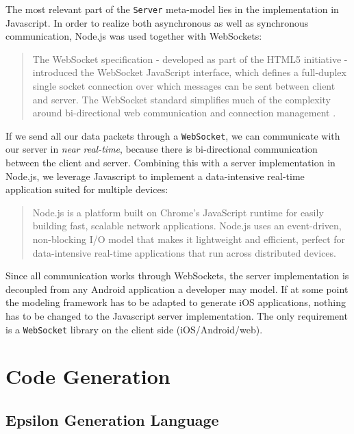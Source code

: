 The most relevant part of the \texttt{Server} meta-model lies in the implementation in Javascript. In order to realize both asynchronous as well as synchronous communication, Node.js \cite{NodeJS} was used together with WebSockets:
\begin{quotation}
The WebSocket specification - developed as part of the HTML5 initiative - introduced the WebSocket JavaScript interface, which defines a full-duplex single socket connection over which messages can be sent between client and server. The WebSocket standard simplifies much of the complexity around bi-directional web communication and connection management \cite{WebSockets}. 
\end{quotation}
If we send all our data packets through a \texttt{WebSocket}, we can communicate with our server in \textit{near real-time}, because there is bi-directional communication between the client and server. Combining this with a server implementation in Node.js, we leverage Javascript to implement a data-intensive real-time application suited for multiple devices:
\begin{quotation}
Node.js is a platform built on Chrome's JavaScript runtime for easily building fast, scalable network applications. Node.js uses an event-driven, non-blocking I/O model that makes it lightweight and efficient, perfect for data-intensive real-time applications that run across distributed devices.
\end{quotation}
Since all communication works through WebSockets, the server implementation is decoupled from any Android application a developer may model. If at some point the modeling framework has to be adapted to generate iOS applications, nothing has to be changed to the Javascript server implementation. The only requirement is a \texttt{WebSocket} library on the client side (iOS/Android/web).

\section{Code Generation}

\subsection{Epsilon Generation Language}

